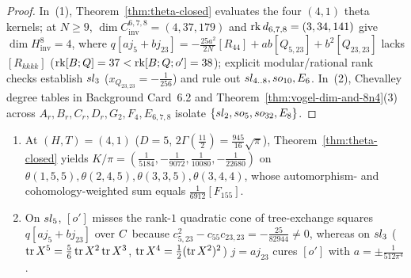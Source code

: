 \begin{proof}
In~(1), Theorem~\ref{thm:theta-closed} evaluates the four $(4,1)$ theta kernels; at $N \ge 9$, $\dim C^{6,7,8}_{\mathrm{inv}} = (4,37,179)$ and $\operatorname{rk} d_{6,7,8} = (3,34,141)$ give $\dim H^8_{\mathrm{inv}} = 4$, where $q[a j_5 + b j_{23}] = -\frac{25a^2}{2N}[R_{44}] + ab[Q_{5,23}] + b^2[Q_{23,23}]$ lacks $[R_{kkkk}]$ ($\operatorname{rk}[B;Q] = 37 < \operatorname{rk}[B;Q;o'] = 38$); explicit modular/rational rank checks establish $sl_3$ ($x_{Q_{23,23}} = -\frac{1}{256}$) and rule out $sl_{4..8}, so_{10}, E_6$. In~(2), Chevalley degree tables in Background Card~6.2 and Theorem~\ref{thm:vogel-dim-and-8n4}(3) across $A_r,B_r,C_r,D_r,G_2,F_4,E_{6,7,8}$ isolate $\{sl_2,so_5,so_{32},E_8\}$.
\end{proof}

\begin{lemma}
\label{lem:9d-cs-sl5-sl3}
\leavevmode
\begin{enumerate}[label=(\arabic*),leftmargin=*]
  \item At $(H,T) = (4,1)$ ($D=5$, $2\Gamma(\frac{11}{2}) = \frac{945}{16}\sqrt{\pi}$), Theorem~\ref{thm:theta-closed} yields $K/\pi = (\frac{1}{5184}, -\frac{1}{9072}, \frac{1}{10080}, -\frac{1}{22680})$ on $\theta(1,5,5), \theta(2,4,5), \theta(3,3,5), \theta(3,4,4)$, whose automorphism- and cohomology-weighted sum equals $\frac{1}{6912}[F_{155}]$.

  \item On $sl_5$, $[o']$ misses the rank-$1$ quadratic cone of tree-exchange squares $q[a j_5 + b j_{23}]$ over $C$ because $c_{5,23}^2 - c_{55}c_{23,23} = -\frac{25}{82944} \neq 0$, whereas on $sl_3$ ($\operatorname{tr} X^5 = \frac{5}{6}\operatorname{tr} X^2\operatorname{tr} X^3$, $\operatorname{tr} X^4 = \frac{1}{2}(\operatorname{tr} X^2)^2$) $j = a j_{23}$ cures $[o']$ with $a = \pm\frac{1}{512\pi^4}$.
\end{enumerate}
\end{lemma}

